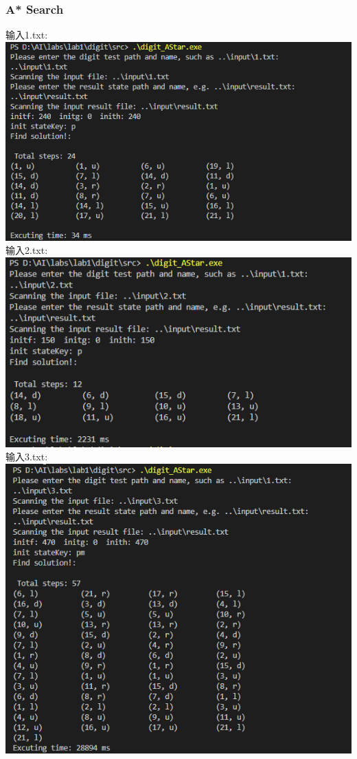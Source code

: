 \documentclass{article}
\begin{document}
	\subsubsection*{A* Search}
	输入1.txt:\\
	\includegraphics*[scale = 0.6]{1.png}\\
	输入2.txt:\\
	\includegraphics*[scale = 0.6]{2.png}\\
	输入3.txt:\\
	\includegraphics*[scale = 0.6]{3.png}\\
\end{document}
